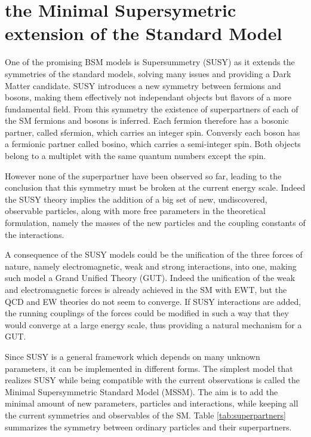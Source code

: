 \section{the Minimal Supersymetric extension of the Standard Model}
\label{sec:MSSM}

One of the promising BSM models is Supersummetry (SUSY) as it extends the symmetries of the standard models, solving many issues and providing a Dark Matter candidate. SUSY \cite{Martin:1997ns} introduces a new symmetry between fermions and bosons, making them effectively not independant objects but flavors of a more fundamental field. From this symmetry the existence of superpartners of each of the SM fermions and bosons is inferred. Each fermion therefore has a bosonic partner, called sfermion, which carries an integer spin. Conversly each boson has a fermionic partner called bosino, which carries a semi-integer spin. Both objects belong to a multiplet with the same quantum numbers except the spin.\newline

However none of the superpartner have been observed so far, leading to the conclusion that this symmetry must be broken at the current energy scale. Indeed the SUSY theory implies the addition of a big set of new, undiscovered, observable particles, along with more free parameters in the theoretical formulation, namely the masses of the new particles and the coupling constants of the interactions.\newline

A consequence of the SUSY models could be the unification of the three forces of nature, namely electromagnetic, weak and strong interactions, into one, making such model a Grand Unified Theory (GUT). Indeed the unification of the weak and electromagnetic forces is already achieved in the SM with EWT, but the QCD and EW theories do not seem to converge. If SUSY interactions are added, the running couplings of the forces could be modified in such a way that they would converge at a large energy scale, thus providing a natural mechanism for a GUT.\newline

Since SUSY is a general framework which depends on many unknown parameters, it can be implemented in different forms. The simplest model that realizes SUSY while being compatible with the current observations is called the Minimal Supersymmetric Standard Model (MSSM). The aim is to add the minimal amount of new parameters, particles and interactions, while keeping all the current symmetries and observables of the SM. Table \ref{tab:superpartners} summarizes the symmetry between ordinary particles and their superpartners.

